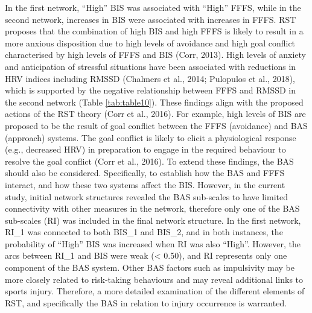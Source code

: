 \documentclass[
]{frontiersHLTH}
\begin{document}
In the first network, ``High'' BIS was associated with ``High'' FFFS,
while in the second network, increases in BIS were associated with
increases in FFFS. RST proposes that the combination of high BIS and
high FFFS is likely to result in a more anxious disposition due to high
levels of avoidance and high goal conflict characterised by high levels
of FFFS and BIS (Corr, 2013). High levels of anxiety and anticipation of
stressful situations have been associated with reductions in HRV indices
including RMSSD (Chalmers et al., 2014; Pulopulos et al., 2018), which
is supported by the negative relationship between FFFS and RMSSD in the
second network (Table \ref{tab:table10}). These findings align with the
proposed actions of the RST theory (Corr et al., 2016). For example,
high levels of BIS are proposed to be the result of goal conflict
between the FFFS (avoidance) and BAS (approach) systems. The goal
conflict is likely to elicit a physiological response (e.g., decreased
HRV) in preparation to engage in the required behaviour to resolve the
goal conflict (Corr et al., 2016). To extend these findings, the BAS
should also be considered. Specifically, to establish how the BAS and
FFFS interact, and how these two systems affect the BIS. However, in the
current study, initial network structures revealed the BAS sub-scales to
have limited connectivity with other measures in the network, therefore
only one of the BAS sub-scales (RI) was included in the final network
structure. In the first network, RI\_1 was connected to both BIS\_1 and
BIS\_2, and in both instances, the probability of ``High'' BIS was
increased when RI was also ``High''. However, the arcs between RI\_1 and
BIS were weak (\textless{} 0.50), and RI represents only one component
of the BAS system. Other BAS factors such as impulsivity may be more
closely related to risk-taking behaviours and may reveal additional
links to sports injury. Therefore, a more detailed examination of the
different elements of RST, and specifically the BAS in relation to
injury occurrence is warranted.
\end{document}
